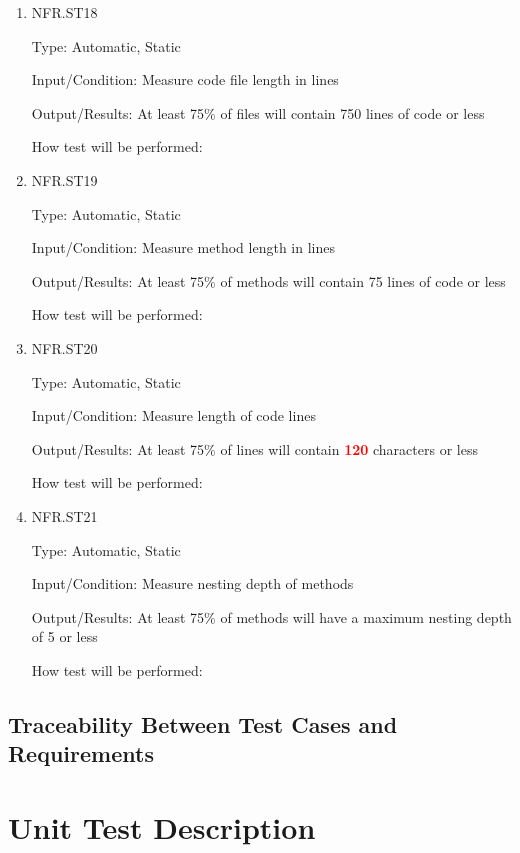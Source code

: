 \documentclass[12pt, titlepage]{article}
\begin{document}
\begin{enumerate}

\item{NFR.ST18\\}

Type: Automatic, Static

Input/Condition: Measure code file length in lines

Output/Results: At least 75\% of files will contain 750 lines of code or less

How test will be performed: 

\item{NFR.ST19\\}

Type: Automatic, Static

Input/Condition: Measure method length in lines

Output/Results: At least 75\% of methods will contain 75 lines of code or less

How test will be performed: 

\item{NFR.ST20\\}

Type: Automatic, Static

Input/Condition: Measure length of code lines

Output/Results: At least 75\% of lines will contain \textcolor{red}{\bf 120} characters or less

How test will be performed: 

\item{NFR.ST21\\}

Type: Automatic, Static

Input/Condition: Measure nesting depth of methods

Output/Results: At least 75\% of methods will have a maximum nesting depth of 5 or less

How test will be performed: 

\end{enumerate}

\subsection{Traceability Between Test Cases and Requirements}


\section{Unit Test Description}
\end{document}

